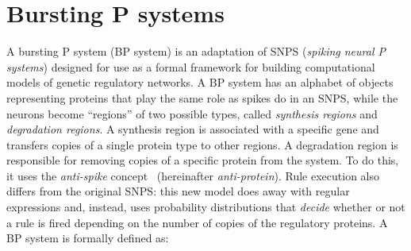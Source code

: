 \documentclass[runningheads,a4paper]{llncs}
\begin{document}
\section{Bursting P systems}
A bursting P system (BP system) is an adaptation of SNPS (\emph{spiking neural P systems}) designed for use as a formal framework for building computational models of genetic regulatory networks. A BP system has an alphabet of objects representing proteins that play the same role as spikes do in an SNPS, while the neurons become “regions” of two possible types, called \emph{synthesis regions} and \emph{degradation regions}. A synthesis region is associated with a specific gene and transfers copies of a single protein type to other regions. A degradation region is responsible for removing copies of a specific protein from the system. To do this, it uses the \emph{anti-spike} concept~\cite{Pan2009} (hereinafter \emph{anti-protein}). Rule execution also differs from the original SNPS: this new model does away with regular expressions and, instead, uses probability distributions that \emph{decide} whether or not a rule is fired depending on the number of copies of the regulatory proteins. A BP system is formally defined as:
\end{document}
